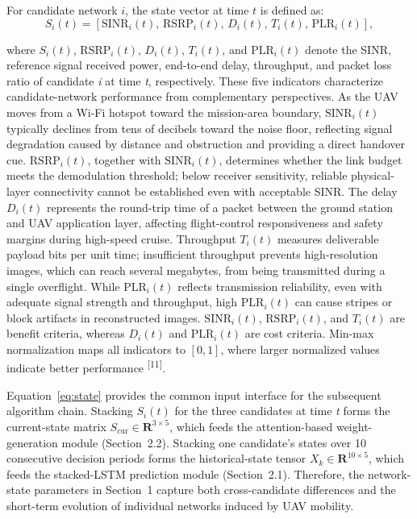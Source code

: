 \documentclass[10pt,a4paper]{article}
\newcommand{\upcite}[1]{\textsuperscript{[#1]}}
\begin{document}
For candidate network $i$, the state vector at time $t$ is defined as:
\begin{equation}
S_i(t)=\left[\mathrm{SINR}_i(t),\,\mathrm{RSRP}_i(t),\,D_i(t),\,T_i(t),\,\mathrm{PLR}_i(t)\right],
\label{eq:state}
\end{equation}

where $S_i(t)$, $\mathrm{RSRP}_i(t)$, $D_i(t)$, $T_i(t)$, and $\mathrm{PLR}_i(t)$ denote the SINR, reference signal received power, end-to-end delay, throughput, and packet loss ratio of candidate \textit{i} at time \textit{t}, respectively. These five indicators characterize candidate-network performance from complementary perspectives. As the UAV moves from a Wi-Fi hotspot toward the mission-area boundary, $\mathrm{SINR}_i(t)$ typically declines from tens of decibels toward the noise floor, reflecting signal degradation caused by distance and obstruction and providing a direct handover cue. $\mathrm{RSRP}_i(t)$, together with $\mathrm{SINR}_i(t)$, determines whether the link budget meets the demodulation threshold; below receiver sensitivity, reliable physical-layer connectivity cannot be established even with acceptable SINR. The delay $D_i(t)$ represents the round-trip time of a packet between the ground station and UAV application layer, affecting flight-control responsiveness and safety margins during high-speed cruise. Throughput $T_i(t)$ measures deliverable payload bits per unit time; insufficient throughput prevents high-resolution images, which can reach several megabytes, from being transmitted during a single overflight. While $\mathrm{PLR}_i(t)$ reflects transmission reliability, even with adequate signal strength and throughput, high $\mathrm{PLR}_i(t)$ can cause stripes or block artifacts in reconstructed images. $\mathrm{SINR}_i(t)$, $\mathrm{RSRP}_i(t)$, and $T_i(t)$ are benefit criteria, whereas $D_i(t)$ and $\mathrm{PLR}_i(t)$ are cost criteria. Min-max normalization maps all indicators to $[0,1]$, where larger normalized values indicate better performance \upcite{11}.

Equation~\eqref{eq:state} provides the common input interface for the subsequent algorithm chain. Stacking $S_i(t)$ for the three candidates at time \textit{t} forms the current-state matrix $S_{\mathrm{cur}}\in\mathbf{R}^{3\times5}$, which feeds the attention-based weight-generation module (Section~2.2). Stacking one candidate's states over 10 consecutive decision periods forms the historical-state tensor $X_k\in\mathbf{R}^{10\times5}$, which feeds the stacked-LSTM prediction module (Section~2.1). Therefore, the network-state parameters in Section~1 capture both cross-candidate differences and the short-term evolution of individual networks induced by UAV mobility.
\end{document}
